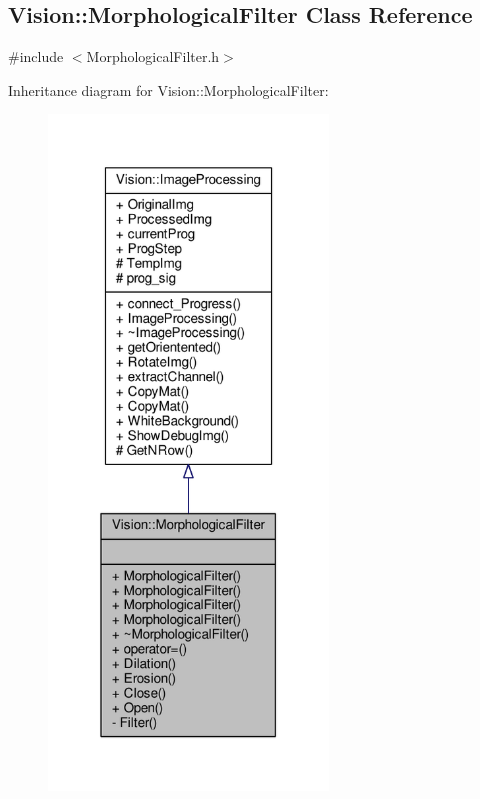\hypertarget{class_vision_1_1_morphological_filter}{}\subsection{Vision\+:\+:Morphological\+Filter Class Reference}
\label{class_vision_1_1_morphological_filter}


{\ttfamily \#include $<$Morphological\+Filter.\+h$>$}



Inheritance diagram for Vision\+:\+:Morphological\+Filter\+:
\nopagebreak
\begin{figure}[H]
\begin{center}
\leavevmode
\includegraphics[width=211pt]{class_vision_1_1_morphological_filter__inherit__graph}
\end{center}
\end{figure}


